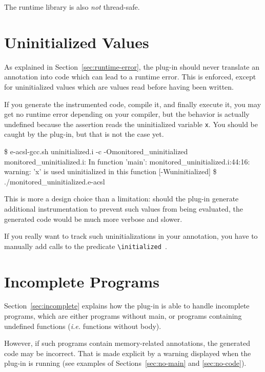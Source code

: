 \begin{important}
The runtime library is also \emph{not} thread-safe.
\end{important}

\section{Uninitialized Values}

As explained in Section~\ref{sec:runtime-error}, the \eacsl plug-in should never
translate an annotation into \C code which can lead to a runtime error. This is
enforced, except for uninitialized values which are values read before having
been written.


If you generate the instrumented code, compile it, and finally execute it, you
may get no runtime error depending on your \C compiler, but the behavior is
actually undefined because the assertion reads the uninitialized variable
\lstinline|x|. You should be caught by the \eacsl plug-in, but that is not
the case yet.

\begin{logs}
\$ e-acsl-gcc.sh uninitialized.i -c -Omonitored_uninitialized
monitored_uninitialized.i: In function 'main':
monitored_uninitialized.i:44:16: warning: 'x' is used uninitialized in this function
[-Wuninitialized]
\$ ./monitored_uninitialized.e-acsl
\end{logs}

This is more a design choice than a limitation: should the \eacsl plug-in
generate additional instrumentation to prevent such values from being evaluated,
the generated code would be much more verbose and slower.

If you really want to track such uninitializations in your annotation, you have
to manually add calls to the \eacsl predicate
\lstinline|\initialized|~\cite{eacsl}.

\section{Incomplete Programs}

Section~\ref{sec:incomplete} explains how the \eacsl plug-in is able to handle
incomplete programs, which are either programs without main, or programs
containing undefined functions (\emph{i.e.} functions without body).

However, if such programs contain memory-related annotations, the generated code
may be incorrect. That is made explicit by a warning displayed when the \eacsl
plug-in is running (see examples of Sections~\ref{sec:no-main} and
\ref{sec:no-code}).

